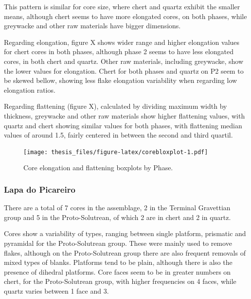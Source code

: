 \documentclass[12pt,twoside]{reedthesis}
\begin{document}
This pattern is similar for core size, where chert and quartz exhibit the smaller means, although chert seems to have more elongated cores, on both phases, while greywacke and other raw materials have bigger dimensions.

Regarding elongation, figure X shows wider range and higher elongation values for chert cores in both phases, although phase 2 seems to have less elongated cores, in both chert and quartz. Other raw materials, including greywacke, show the lower values for elongation. Chert for both phases and quartz on P2 seem to be skewed bellow, showing less flake elongation variability when regarding low elongation ratios.

Regarding flattening (figure X), calculated by dividing maximum width by thickness, greywacke and other raw materials show higher flattening values, with quartz and chert showing similar values for both phases, with flattening median values of around 1.5, fairly centered in between the second and third quartil.
\begin{figure}
\centering
\texttt{[image: thesis\_files/figure-latex/corebloxplot-1.pdf]}
\caption{\label{fig:corebloxplot}Core elongation and flattening boxplots by Phase.}
\end{figure}
\hypertarget{lapa-do-picareiro-2}{%
\subsubsection{Lapa do Picareiro}\label{lapa-do-picareiro-2}}

There are a total of 7 cores in the assemblage, 2 in the Terminal Gravettian group and 5 in the Proto-Solutrean, of which 2 are in chert and 2 in quartz.

Cores show a variability of types, ranging between single platform, prismatic and pyramidal for the Proto-Solutrean group. These were mainly used to remove flakes, although on the Proto-Solutrean group there are also frequent removals of mixed types of blanks. Platforms tend to be plain, although there is also the presence of dihedral platforms. Core faces seem to be in greater numbers on chert, for the Proto-Solutrean group, with higher frequencies on 4 faces, while quartz varies between 1 face and 3.
\end{document}
